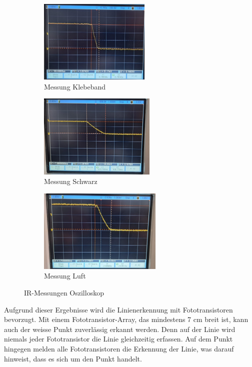 \documentclass[../main.tex]{subfiles}
\begin{document}
\begin{figure}[htbp]
    \raggedright
    \begin{subfigure}[b]{0.3\textwidth}
        \includegraphics[height=4cm]{img/sensortest/IR_Klebeband.jpg}
        \caption{Messung Klebeband}
        \label{fig:IR_Klebeband}
    \end{subfigure}
    \hspace{0.2cm}  %
    \begin{subfigure}[b]{0.3\textwidth}
        \includegraphics[height=4cm]{img/sensortest/IR_Schwarz.jpg}
        \caption{Messung Schwarz}
        \label{fig:IR_Schwarz}
    \end{subfigure}
    \hspace{0.5cm}  %
    \begin{subfigure}[b]{0.3\textwidth}
        \includegraphics[height=4cm]{img/sensortest/IR_Luft.jpg}
        \caption{Messung Luft}
        \label{fig:IR_Luft}
    \end{subfigure}
    \caption{IR-Messungen Oszilloskop}
    \label{fig:IR_Messungen}
\end{figure}

Aufgrund dieser Ergebnisse wird die Linienerkennung mit Fototransistoren bevorzugt. Mit einem Fototransistor-Array, das mindestens 7 cm breit ist, kann auch der weisse Punkt zuverlässig erkannt werden. Denn auf der Linie wird niemals jeder Fototransistor die Linie gleichzeitig erfassen. Auf dem Punkt hingegen melden alle Fototransistoren die Erkennung der Linie, was darauf hinweist, dass es sich um den Punkt handelt.
\newpage    
\end{document}
